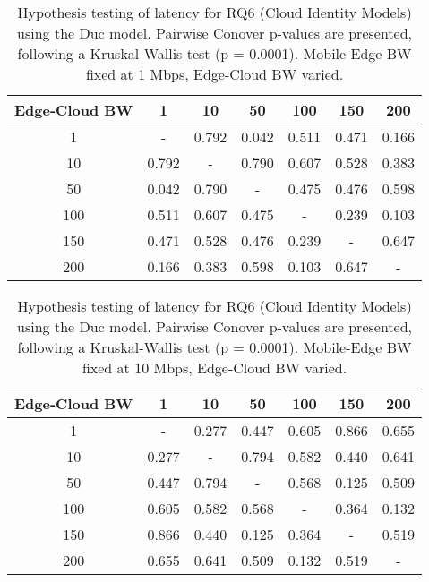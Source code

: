 \begin{table}[H]
\caption{Hypothesis testing of latency for RQ6 (Cloud Identity Models) using the Duc model. Pairwise Conover p-values are presented, following a Kruskal-Wallis test (p = 0.0001). Mobile-Edge BW fixed at 1 Mbps, Edge-Cloud BW varied.}
\centering
\begin{tabular}{c|cccccc}
Edge-Cloud BW & 1 & 10 & 50 & 100 & 150 & 200 \\
\hline
1 & - & 0.792 & 0.042 & 0.511 & 0.471 & 0.166 \\
10 & 0.792 & - & 0.790 & 0.607 & 0.528 & 0.383 \\
50 & 0.042 & 0.790 & - & 0.475 & 0.476 & 0.598 \\
100 & 0.511 & 0.607 & 0.475 & - & 0.239 & 0.103 \\
150 & 0.471 & 0.528 & 0.476 & 0.239 & - & 0.647 \\
200 & 0.166 & 0.383 & 0.598 & 0.103 & 0.647 & - \\
\end{tabular}
\end{table}

\begin{table}[H]
\caption{Hypothesis testing of latency for RQ6 (Cloud Identity Models) using the Duc model. Pairwise Conover p-values are presented, following a Kruskal-Wallis test (p = 0.0001). Mobile-Edge BW fixed at 10 Mbps, Edge-Cloud BW varied.}
\centering
\begin{tabular}{c|cccccc}
Edge-Cloud BW & 1 & 10 & 50 & 100 & 150 & 200 \\
\hline
1 & - & 0.277 & 0.447 & 0.605 & 0.866 & 0.655 \\
10 & 0.277 & - & 0.794 & 0.582 & 0.440 & 0.641 \\
50 & 0.447 & 0.794 & - & 0.568 & 0.125 & 0.509 \\
100 & 0.605 & 0.582 & 0.568 & - & 0.364 & 0.132 \\
150 & 0.866 & 0.440 & 0.125 & 0.364 & - & 0.519 \\
200 & 0.655 & 0.641 & 0.509 & 0.132 & 0.519 & - \\
\end{tabular}
\end{table}

